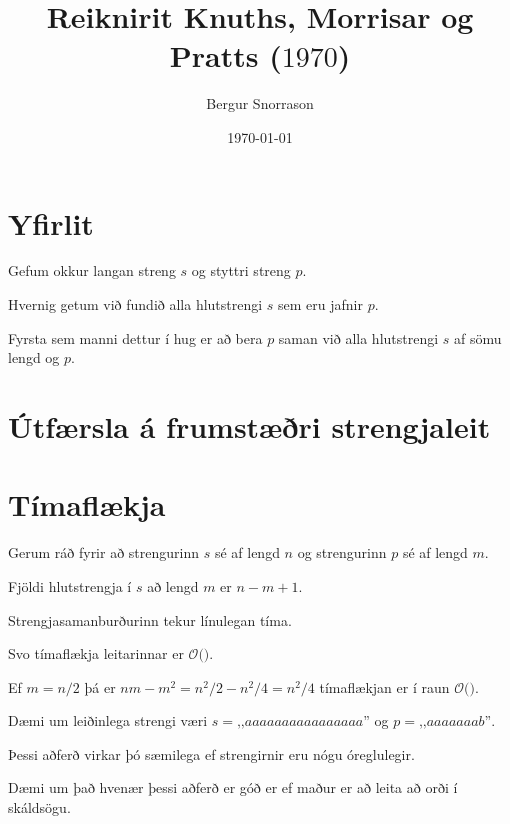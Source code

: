 \title{Reiknirit Knuths, Morrisar og Pratts ($1970$)}
\author{Bergur Snorrason}
\date{\today}



\frame{\titlepage}

\section{Yfirlit}
{
    {
        \item<1-> Gefum okkur langan streng $s$ og styttri streng $p$.
        \item<2-> Hvernig getum við fundið alla hlutstrengi $s$ sem eru jafnir $p$.
        \item<3-> Fyrsta sem manni dettur í hug er að bera $p$ saman við alla hlutstrengi $s$ af sömu lengd og $p$.
    }
}

\section{Útfærsla á frumstæðri strengjaleit}
{
}

\section{Tímaflækja}
{
    {
        \item<1-> Gerum ráð fyrir að strengurinn $s$ sé af lengd $n$ og strengurinn $p$ sé af lengd $m$.
        \item<2-> Fjöldi hlutstrengja í $s$ að lengd $m$ er $n - m + 1$.
        \item<3-> Strengjasamanburðurinn tekur línulegan tíma.
        \item<4-> Svo tímaflækja leitarinnar er $\mathcal{O}($$)$.
        \item<6-> Ef $m = n/2$ þá er $nm - m^2 = n^2/2 - n^2/4 = n^2/4$ tímaflækjan er í raun $\mathcal{O}($$)$.
        \item<8-> Dæmi um leiðinlega strengi væri $s = \text{,,}aaaaaaaaaaaaaaaa\text{''}$ og $p = \text{,,}aaaaaaab\text{''}$.
        \item<9-> Þessi aðferð virkar þó sæmilega ef strengirnir eru nógu óreglulegir.
        \item<10-> Dæmi um það hvenær þessi aðferð er góð er ef maður er að leita að orði í skáldsögu.
    }
}


